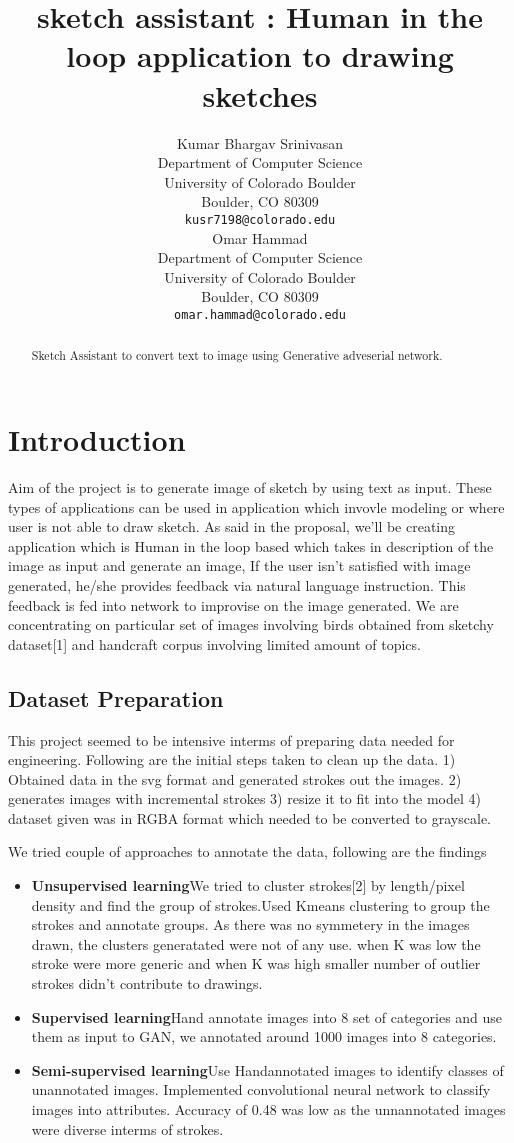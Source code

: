 \documentclass{article}
\title{sketch assistant : Human in the loop application to drawing sketches}
\author{
  Kumar Bhargav Srinivasan \\
  Department of Computer Science\\
  University of Colorado Boulder\\
  Boulder, CO 80309 \\
  \texttt{kusr7198@colorado.edu} \\
	\And
  Omar Hammad \\
  Department of Computer Science\\
  University of Colorado Boulder\\
  Boulder, CO 80309 \\
  \texttt{omar.hammad@colorado.edu} \\
  }
\begin{document}
\maketitle
\begin{abstract}
Sketch Assistant to convert text to image using Generative adveserial network.
\end{abstract}
\section{Introduction}
Aim of the project is to generate image of sketch by using text as input. These types of applications can be used in application which invovle modeling or where user is not able to draw sketch.
As said in the proposal, we'll be creating application which is Human in the loop based which takes in description of the image as input and generate an
image, If the user isn’t satisfied with image generated, he/she provides feedback
via natural language instruction. This feedback is fed into network to improvise on
the image generated.
We are concentrating on particular set of images involving birds obtained from sketchy dataset[1] and handcraft corpus involving limited amount of topics.

\subsection{Dataset Preparation}
This project seemed to be intensive interms of preparing data needed for engineering.
Following are the initial steps taken to clean up the data.
1) Obtained data in the svg format and generated strokes out the images.
2) generates images with incremental strokes
3) resize it to fit into the model
4) dataset given was in RGBA format which needed to be converted to grayscale.

We tried couple of approaches to annotate the data, following are the findings
\begin{itemize}
\item \textbf{Unsupervised learning}\newline We tried to cluster strokes[2] by length/pixel density and find the group of strokes.Used Kmeans clustering to group the strokes and annotate groups. As there was no symmetery in the images drawn, the clusters generatated were not of any use. when K was low the stroke were more generic and when K was high smaller number of outlier strokes didn't contribute to drawings.\newline
\item \textbf{Supervised learning}\newline Hand annotate images into 8 set of categories and use them as input to GAN, we annotated around 1000 images into 8 categories.
\item \textbf{Semi-supervised learning}\newline Use Handannotated images to identify classes of unannotated images. Implemented convolutional neural network to classify images into attributes. Accuracy of 0.48 was low as the unnannotated images were diverse interms of strokes.
\end{itemize}
\end{document}
